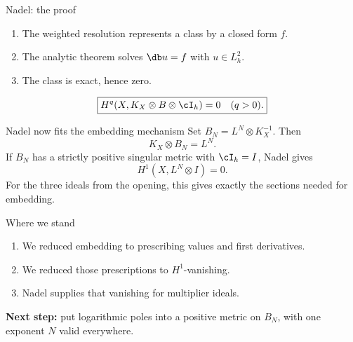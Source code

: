 \begin{frame}{Nadel: the proof}
\begin{enumerate}
\setlength{\itemsep}{14pt}
\item The weighted resolution represents a class by a closed form \(f\).
\item The analytic theorem solves \(\db u=f\) with \(u\in L^2_h\).
\item The class is exact, hence zero.
\end{enumerate}
\[
\boxed{H^q(X,K_X\otimes B\otimes\cI_h)=0\quad(q>0).}
\]
\end{frame}

\begin{frame}{Nadel now fits the embedding mechanism}
Set \(B_N=L^N\otimes K_X^{-1}\). Then
\[
K_X\otimes B_N=L^N.
\]
If \(B_N\) has a strictly positive singular metric with \(\cI_h=I\), Nadel gives
\[
\boxed{H^1(X,L^N\otimes I)=0.}
\]
For the three ideals from the opening, this gives exactly the sections needed for embedding.
\end{frame}

\begin{frame}{Where we stand}
\begin{enumerate}
\setlength{\itemsep}{13pt}
\item We reduced embedding to prescribing values and first derivatives.
\item We reduced those prescriptions to \(H^1\)-vanishing.
\item Nadel supplies that vanishing for multiplier ideals.
\end{enumerate}
\par\bigskip
\textbf{Next step:} put logarithmic poles into a positive metric on \(B_N\), with one exponent \(N\) valid everywhere.
\end{frame}

